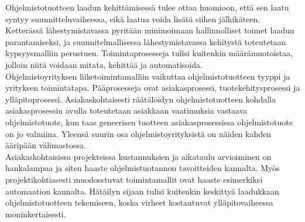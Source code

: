 \documentclass[finnish,12pt,a4paper,pdftex]{article}
\begin{document}
Ohjelmistotuotteen laadun kehittämisessä tulee ottaa huomioon, että sen laatu syntyy suunnitteluvaiheessa, eikä laatua voida lisätä siihen jälkikäteen. Ketterässä lähestymistavassa pyritään minimoimaan hallinnolliset toimet laadun parantamiseksi, ja suunnitelmallisessa lähestymistavassa kehitystä toteutetaan kypsyysmalliin perustuen. Toimintaprosesseja tulisi kuitenkin määrämuotoistaa, jolloin niitä voidaan mitata, kehittää ja automatisoida. \\

Ohjelmistoyrityksen liiketoimintamalliin vaikuttaa ohjelmistotuotteen tyyppi ja yrityksen toimintatapa. Pääprosesseja ovat asiakasprosessi, tuotekehitysprosessi ja ylläpitoprosessi. Asiakaskohtaisesti räätälöidyn ohjelmistotuotteen kohdalla asiakasprosessin avulla toteutetaan asiakkaan vaatimuksia vastaava ohjelmistotuote, kun taas geneerisen tuotteen asiakasprosessissa ohjelmistotuote on jo valmiina. Yleensä suurin osa ohjelmistoyrityksistä on näiden kahden ääripään välimastossa.\\

Asiakaskohtaisissa projekteissa kustannuksien ja aikataulu arvioiminen on hankalampaa ja siten haaste ohjelmistuotannon tavoitteiden kannalta. Myös projektikohtiasesti muodosstuvat toimintamallit ovat haaste esimerkiksi automaation kannalta. Hätäilyn sijaan tulisi kuitenkin keskittyä laadukkaan ohjelmistotuotteen tekemiseen, koska virheet kostautuvat ylläpitovaiheessa moninkertaisesti.




\end{document}
